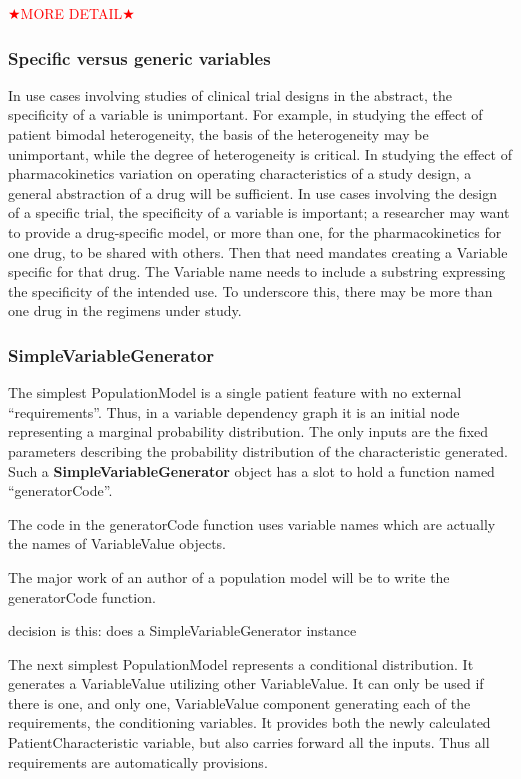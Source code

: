 \documentclass[12pt]{amsart}
\def\comment<#1>{\textcolor{red}{$\bigstar$#1$\bigstar$}}
\def\code<#1>{\textbf{#1}}
\begin{document}
\comment<MORE DETAIL>


\subsubsection{Specific versus generic variables}


In  use cases involving studies of clinical trial designs in the abstract,
the specificity of a variable is unimportant.
For example, in studying the effect of patient bimodal heterogeneity,
the basis of the heterogeneity may be unimportant,
while the degree of heterogeneity is critical.
In studying the effect of pharmacokinetics variation on 
operating characteristics of a study design,
a general  abstraction of a drug will be sufficient.
In use cases involving the design of a specific trial,
the specificity of a variable is important;
a researcher may want to provide a
 drug-specific model,
or more than one,
for the pharmacokinetics for one drug,
to be shared with others.
Then that need mandates creating a Variable specific for that drug.
The Variable name needs to include a substring expressing the specificity 
of the intended use.
To underscore this, there may be more than one drug in the regimens under study.

\subsubsection{SimpleVariableGenerator}

The simplest PopulationModel is a single patient feature with no 
external ``requirements''. 
Thus, in a variable dependency graph
it is an initial node representing a marginal probability distribution.
The only inputs are the fixed parameters 
describing the probability distribution of the characteristic generated.
Such a \code<SimpleVariableGenerator> object
has a slot to hold a function named ``generatorCode''.

The code in the generatorCode function uses variable names which are actually
the names of VariableValue objects.

The major work of an author of a population model 
will be to write the generatorCode function.

decision is this:
does a SimpleVariableGenerator instance

The next simplest PopulationModel represents a conditional distribution.
It generates a VariableValue utilizing other VariableValue.
It can only be used if there is one, and only one, VariableValue component
generating each of the requirements, the conditioning variables. It
provides both the newly calculated PatientCharacteristic variable,
but also carries forward all the inputs. Thus all requirements are 
automatically provisions.
\end{document}
